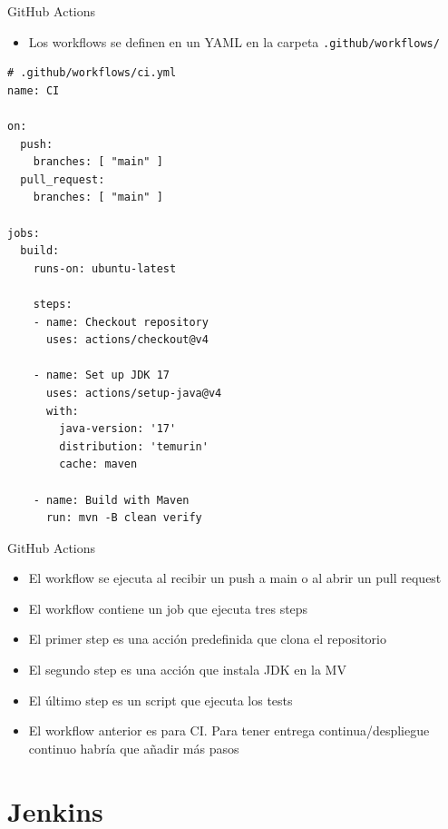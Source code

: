 \documentclass{beamer}
\begin{document}
\begin{frame}[fragile]{GitHub Actions}
\begin{itemize}
    \item Los workflows se definen en un YAML en la carpeta \texttt{.github/workflows/} 
\end{itemize}

\begin{verbatim}
# .github/workflows/ci.yml
name: CI

on:
  push:
    branches: [ "main" ]
  pull_request:
    branches: [ "main" ]

jobs:
  build:
    runs-on: ubuntu-latest

    steps:
    - name: Checkout repository
      uses: actions/checkout@v4

    - name: Set up JDK 17
      uses: actions/setup-java@v4
      with:
        java-version: '17'
        distribution: 'temurin'
        cache: maven

    - name: Build with Maven
      run: mvn -B clean verify
\end{verbatim}
\end{frame}

\begin{frame}{GitHub Actions}

\begin{itemize}
    \item El workflow se ejecuta al recibir un push a main o al abrir un pull request
    \item El workflow contiene un job que ejecuta tres steps
    \item El primer step es una acción predefinida que clona el repositorio
    \item El segundo step es una acción que instala JDK en la MV
    \item El último step es un script que ejecuta los tests
    \item El workflow anterior es para CI. Para tener entrega continua/despliegue continuo habría que añadir más pasos

\end{itemize}
    
\end{frame}

\section{Jenkins}
\end{document}
